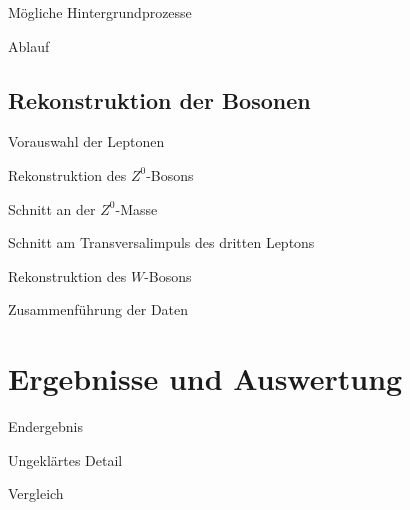 \documentclass{beamer}
\begin{document}
\begin{frame}{Mögliche Hintergrundprozesse}
\end{frame}

\begin{frame}{Ablauf}
\end{frame}

\subsection{Rekonstruktion der Bosonen}
\begin{frame}{Vorauswahl der Leptonen}
\end{frame}

\begin{frame}{Rekonstruktion des $Z^0$-Bosons}
\end{frame}
\begin{frame}{Schnitt an der $Z^0$-Masse}
\end{frame}
\begin{frame}{Schnitt am Transversalimpuls des dritten Leptons}
\end{frame}
\begin{frame}{Rekonstruktion des $W$-Bosons}
\end{frame}

\begin{frame}{Zusammenführung der Daten}
\end{frame}

\section{Ergebnisse und Auswertung}
\begin{frame}{Endergebnis}
\end{frame}

\begin{frame}{Ungeklärtes Detail}
\end{frame}

\begin{frame}{Vergleich}
\end{frame}

\end{document}
